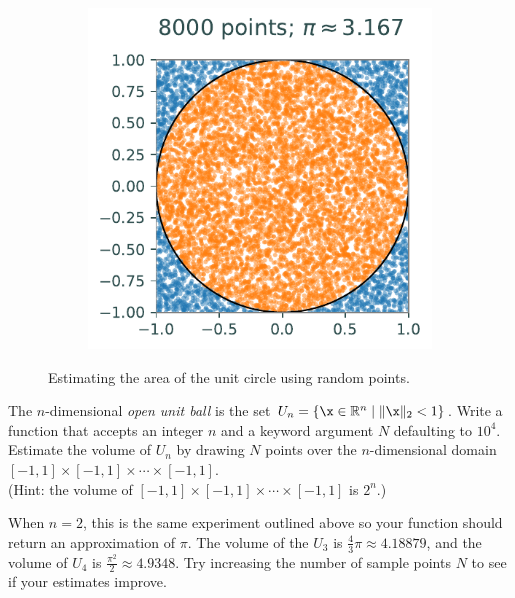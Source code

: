 \begin{figure}[H]
\begin{subfigure}{.32\textwidth}
\end{subfigure}
%
\begin{subfigure}{.32\textwidth}
    \centering
    \includegraphics[width=\textwidth]{figures/mc_circle_8000.pdf}
\end{subfigure}
\caption{Estimating the area of the unit circle using random points.}
\end{figure}

\begin{problem}
The $n$-dimensional \emph{open unit ball} is the set $U_n = \{\x\in\mathbb{R}^n\mid \|\x\|_2 < 1\}$.
Write a function that accepts an integer $n$ and a keyword argument $N$ defaulting to $10^4$.
Estimate the volume of $U_n$ by drawing $N$ points over the $n$-dimensional domain $[-1,1]\times[-1,1]\times\cdots\times[-1,1]$.
\\(Hint: the volume of $[-1,1]\times[-1,1]\times\cdots\times[-1,1]$ is $2^n$.)

When $n=2$, this is the same experiment outlined above so your function should return an approximation of $\pi$.
The volume of the $U_3$ is $\frac{4}{3}\pi \approx 4.18879$, and the volume of $U_4$ is $\frac{\pi^2}{2} \approx 4.9348$.
Try increasing the number of sample points $N$ to see if your estimates improve.
\label{prob:unit-ball-volume}
\end{problem}


